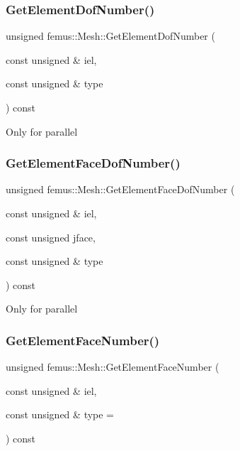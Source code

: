 \subsubsection{\texorpdfstring{Get\+Element\+Dof\+Number()}{GetElementDofNumber()}}
{\footnotesize\ttfamily unsigned femus\+::\+Mesh\+::\+Get\+Element\+Dof\+Number (\begin{DoxyParamCaption}\item[{const unsigned \&}]{iel,  }\item[{const unsigned \&}]{type }\end{DoxyParamCaption}) const}

Only for parallel \mbox{\label{classfemus_1_1_mesh_af372596998e5d55a1fa15d6c5f58f52b}} 
\subsubsection{\texorpdfstring{Get\+Element\+Face\+Dof\+Number()}{GetElementFaceDofNumber()}}
{\footnotesize\ttfamily unsigned femus\+::\+Mesh\+::\+Get\+Element\+Face\+Dof\+Number (\begin{DoxyParamCaption}\item[{const unsigned \&}]{iel,  }\item[{const unsigned}]{jface,  }\item[{const unsigned \&}]{type }\end{DoxyParamCaption}) const}

Only for parallel \mbox{\label{classfemus_1_1_mesh_a5a0c1124aca095fd4327252ebac3660f}} 
\subsubsection{\texorpdfstring{Get\+Element\+Face\+Number()}{GetElementFaceNumber()}}
{\footnotesize\ttfamily unsigned femus\+::\+Mesh\+::\+Get\+Element\+Face\+Number (\begin{DoxyParamCaption}\item[{const unsigned \&}]{iel,  }\item[{const unsigned \&}]{type = {} }\end{DoxyParamCaption}) const}

